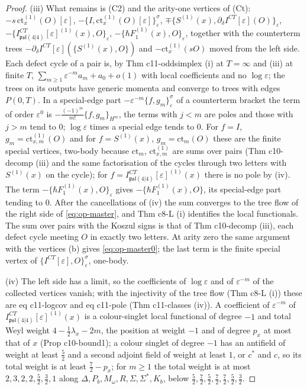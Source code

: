 \documentclass[11pt]{article}
\numberwithin{equation}{section}
\theoremstyle{plain}
\theoremstyle{definition}
\newcommand{\psl}{\mathfrak{psl}(4|4)}
\newcommand{\ct}{\mathrm{ct}}
\begin{document}
\begin{proof}
(iii) What remains is (C2) and the arity-one vertices of (Ct): $-s\,\ct^{(1)}_x(O)[\varepsilon]$, $-\{I,\ct^{(1)}_x(O)[\varepsilon]\}^\sigma_\varepsilon$, $\mp\{S^{(1)}(x),\partial_\delta I^{CT}[\varepsilon](O)\}_\varepsilon$, $-\{I^{CT}_{\psl}[\varepsilon]^{(1)}(x),O\}_\varepsilon$, $-\{\hbar F_1^{(1)}(x),O\}_\varepsilon$, together with the counterterm trees $-\partial_\delta I^{CT}[\varepsilon](\{S^{(1)}(x),O\})$ and $-\ct^{(1)}_x(sO)$ moved from the left side. Each defect cycle of a pair is, by Thm c11-oddsimplex (i) at $T=\infty$ and (iii) at finite $T$, $\sum_{m\ge1}\varepsilon^{-m}a_m+a_0+o(1)$ with local coefficients and no $\log\varepsilon$; the trees on its outputs have generic momenta and converge to trees with edges $P(0,T)$. In a special-edge part $-\varepsilon^{-m}\{f,g_m\}^\sigma_\varepsilon$ of a counterterm bracket the term of order $\varepsilon^0$ is $-\frac{(-1)^m}{m!}\{f,g_m\}_{H^m}$, the terms with $j<m$ are poles and those with $j>m$ tend to $0$; $\log\varepsilon$ times a special edge tends to $0$. For $f=I$, $g_m=\ct^{(1)}_{x,m}(O)$ and for $f=S^{(1)}(x)$, $g_m=\ct_m(O)$ these are the finite special vertices, two-body because $\ct_m$, $\ct^{(1)}_{x,m}$ are sums over pairs (Thm c10-decomp (iii) and the same factorisation of the cycles through two letters with $S^{(1)}(x)$ on the cycle); for $f=I^{CT}_{\psl}[\varepsilon]^{(1)}(x)$ there is no pole by (iv). The term $-\{\hbar F_1^{(1)}(x),O\}_\varepsilon$ gives $-\{\hbar F_1^{(1)}(x),O\}$, its special-edge part tending to $0$. After the cancellations of (iv) the sum converges to the tree flow of the right side of \eqref{eq:op-master}, and Thm c8-L (i) identifies the local functionals. The sum over pairs with the Koszul signs is that of Thm c10-decomp (iii), each defect cycle meeting $O$ in exactly two letters. At arity zero the same argument with the vertices (b) gives \eqref{eq:op-master0}; the last term is the finite special vertex of $\{I^{CT}[\varepsilon],O\}^\sigma_\varepsilon$, one-body.

(iv) The left side has a limit, so the coefficients of $\log\varepsilon$ and of $\varepsilon^{-m}$ of the collected vertices vanish; with the injectivity of the tree flow (Thm c8-L (i)) these are eq c11-logcov and eq c11-pole (Thm c11-classes (iv)). A coefficient of $\varepsilon^{-m}$ of $I^{CT}_{\psl}[\varepsilon]^{(1)}(x)$ is a colour-singlet local functional of degree $-1$ and total Weyl weight $4-\tfrac12\lambda_x-2m$, the position at weight $-1$ and of degree $p_x$ at most that of $x$ (Prop c10-bound1); a colour singlet of degree $-1$ has an antifield of weight at least $\tfrac52$ and a second adjoint field of weight at least $1$, or $c^*$ and $c$, so its total weight is at least $\tfrac72-p_x$; for $m\ge1$ the total weight is at most $2,3,2,2,\tfrac52,\tfrac32,1$ along $\Delta,P_b,M_\omega,R,\Sigma,\Sigma^*,K_b$, below $\tfrac52,\tfrac72,\tfrac52,\tfrac72,\tfrac72,\tfrac52,\tfrac32$.


\end{proof}
\end{document}
